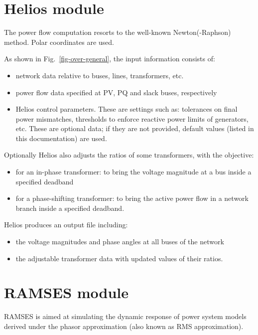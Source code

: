 \section{Helios module}

The power flow computation resorts to the well-known Newton(-Raphson) method. Polar coordinates are used.

As shown in Fig.~\ref{fig-over-general}, the input information consists of:
\begin{itemize}
\item network data relative to buses, lines, transformers, etc.
\item power flow data specified at PV, PQ and slack buses, respectively
\item Helios control parameters. These are settings such as: tolerances on final power mismatches, thresholds to enforce reactive power limits of generators, etc. These are optional data; if they are not provided, default values (listed in this documentation) are used.
\end{itemize}

Optionally Helios also adjusts the ratios of some transformers, with the objective:
\begin{itemize}
\item for an in-phase transformer: to bring the voltage magnitude at a bus inside a specified deadband
\item for a phase-shifting transformer: to bring the active power flow in a network branch inside a specified deadband.
\end{itemize}

Helios produces an output file including:
\begin{itemize}
\item the voltage magnitudes and phase angles at all buses of the network
\item the adjustable transformer data with updated values of their ratios.
\end{itemize}



\section{RAMSES module}

RAMSES is aimed at simulating the dynamic response of power system models derived under the phasor approximation (also known as RMS approximation).

